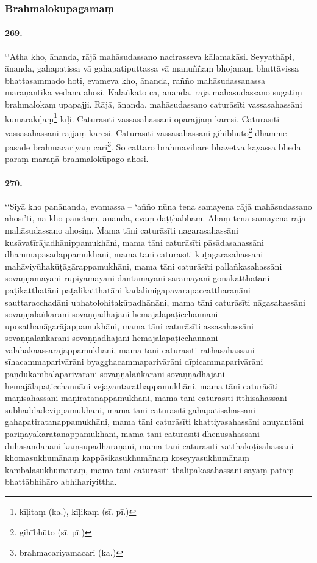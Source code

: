 \subsubsection{Brahmalokūpagamaṃ}

\paragraph{269.} ‘‘Atha kho, ānanda, rājā mahāsudassano nacirasseva kālamakāsi. Seyyathāpi, ānanda, gahapatissa vā gahapatiputtassa vā manuññaṃ bhojanaṃ bhuttāvissa bhattasammado hoti, evameva kho, ānanda, rañño mahāsudassanassa māraṇantikā vedanā ahosi. Kālaṅkato ca, ānanda, rājā mahāsudassano sugatiṃ brahmalokaṃ upapajji. Rājā, ānanda, mahāsudassano caturāsīti vassasahassāni kumārakīḷaṃ\footnote{kīḷitaṃ (ka.), kīḷikaṃ (sī. pī.)} kīḷi. Caturāsīti vassasahassāni oparajjaṃ kāresi. Caturāsīti vassasahassāni rajjaṃ kāresi. Caturāsīti vassasahassāni gihibhūto\footnote{gihībhūto (sī. pī.)} dhamme pāsāde brahmacariyaṃ cari\footnote{brahmacariyamacari (ka.)}. So cattāro brahmavihāre bhāvetvā kāyassa bhedā paraṃ maraṇā brahmalokūpago ahosi.

\paragraph{270.} ‘‘Siyā kho panānanda, evamassa – ‘añño nūna tena samayena rājā mahāsudassano ahosī’ti, na kho panetaṃ, ānanda, evaṃ daṭṭhabbaṃ. Ahaṃ tena samayena rājā mahāsudassano ahosiṃ. Mama tāni caturāsīti nagarasahassāni kusāvatīrājadhānippamukhāni, mama tāni caturāsīti pāsādasahassāni dhammapāsādappamukhāni, mama tāni caturāsīti kūṭāgārasahassāni mahāviyūhakūṭāgārappamukhāni, mama tāni caturāsīti pallaṅkasahassāni sovaṇṇamayāni rūpiyamayāni dantamayāni sāramayāni gonakatthatāni paṭikatthatāni paṭalikatthatāni kadalimigapavarapaccattharaṇāni sauttaracchadāni ubhatolohitakūpadhānāni, mama tāni caturāsīti nāgasahassāni sovaṇṇālaṅkārāni sovaṇṇadhajāni hemajālapaṭicchannāni uposathanāgarājappamukhāni, mama tāni caturāsīti assasahassāni sovaṇṇālaṅkārāni sovaṇṇadhajāni hemajālapaṭicchannāni valāhakaassarājappamukhāni, mama tāni caturāsīti rathasahassāni sīhacammaparivārāni byagghacammaparivārāni dīpicammaparivārāni paṇḍukambalaparivārāni sovaṇṇālaṅkārāni sovaṇṇadhajāni hemajālapaṭicchannāni vejayantarathappamukhāni, mama tāni caturāsīti maṇisahassāni maṇiratanappamukhāni, mama tāni caturāsīti itthisahassāni subhaddādevippamukhāni, mama tāni caturāsīti gahapatisahassāni gahapatiratanappamukhāni, mama tāni caturāsīti khattiyasahassāni anuyantāni pariṇāyakaratanappamukhāni, mama tāni caturāsīti dhenusahassāni duhasandanāni kaṃsūpadhāraṇāni, mama tāni caturāsīti vatthakoṭisahassāni khomasukhumānaṃ kappāsikasukhumānaṃ koseyyasukhumānaṃ kambalasukhumānaṃ, mama tāni caturāsīti thālipākasahassāni sāyaṃ pātaṃ bhattābhihāro abhihariyittha.

